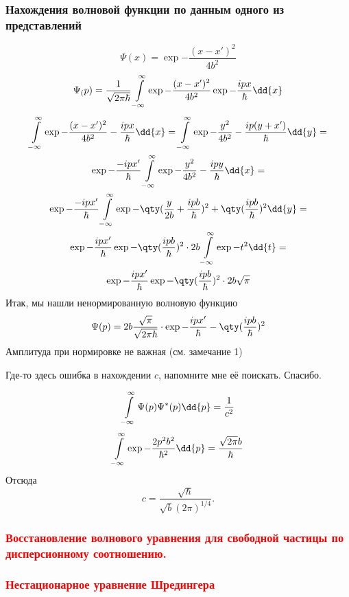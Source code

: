 \subsubsection{Нахождения волновой функции по данным одного из представлений}

$$\Psi(x)= \exp{-\frac{(x-x')^2}{4b^2}} $$
$$\Psi_(p)= \frac{1}{\sqrt{2\pi\hbar}}\infint \exp{-\frac{(x-x')^2}{4b^2}}\exp{-\frac{ipx}{\hbar}} \dd{x} $$
\begin{gather*}
\infint \exp{-\frac{(x-x')^2}{4b^2}-\frac{ipx}{\hbar} }\dd{x} = 
\infint \exp{-\frac{y^2}{4b^2}-\frac{ip(y+x')}{\hbar}} \dd{y} = \\
\exp{-\frac{-ipx'}{\hbar}}\infint \exp{-\frac{y^2}{4b^2}-\frac{ipy}{\hbar}}  \dd{x}=\\
\exp{-\frac{-ipx'}{\hbar}}\infint \exp{-\qty( \frac{y}{2b}+ \frac{ipb}{\hbar})^2
+\qty( \frac{ipb}{\hbar}  )^2} \dd{y}=\\
\exp{-\frac{ipx'}{\hbar}}\exp{-\qty(\frac{ipb}{\hbar})^2}\cdot 2b \infint \exp{-t^2} \dd{t}=\\
\exp{-\frac{ipx'}{\hbar}}\exp{-\qty(\frac{ipb}{\hbar})^2}\cdot 2b\sqrt\pi
\end{gather*}
Итак, мы нашли ненормированную волновую функцию 
$$\Psi(p)= 2b\frac{\sqrt\pi}{\sqrt{2\pi\hbar}} \cdot \exp{-\frac{ipx'}{\hbar}-\qty(\frac{ipb}{\hbar})^2}$$
Амплитуда при нормировке не важная (см. замечание 1)

Где-то здесь ошибка в нахождении $c$, напомните мне её поискать. Спасибо.

$$\infint \Psi(p)\Psi^*(p)\dd{p}=\frac{1}{c^2}$$
$$\infint\exp{-\frac{2p^2b^2}{\hbar^2}}\dd{p}=\frac{\sqrt{2\pi} b}{\hbar}$$
Отсюда 
$$c=\frac{\sqrt{\hbar}}{\sqrt b (2\pi)^{1/4}}.$$
\subsubsection{\textcolor{red} {Восстановление волнового уравнения для свободной частицы по дисперсионному
соотношению.} }

\subsubsection{\textcolor{red} {Нестационарное уравнение Шредингера} }